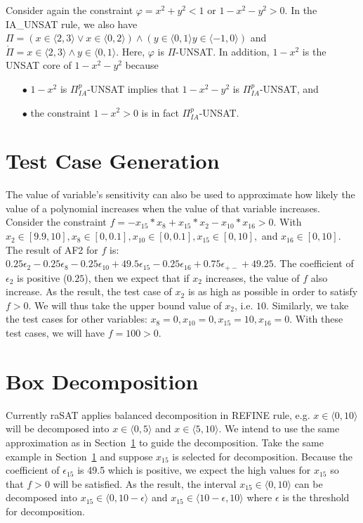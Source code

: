 \begin{example}
Consider again the constraint $\varphi = x^2 + y^2 < 1$ or $1 - x^2 - y^2 > 0$. In the \tiny IA\_UNSAT \normalsize rule, we also have $\Pi = (x \in \langle 2, 3 \rangle \vee x \in \langle 0, 2 \rangle) \wedge (y \in \langle 0, 1 \rangle y \in \langle -1, 0 \rangle)$ and $\mathring\Pi = x \in \langle 2, 3 \rangle \wedge y \in \langle 0, 1 \rangle$. Here, $\varphi$ is $\Pi$-UNSAT. In addition, $1 - x^2$ is the UNSAT core of $1 - x^2 - y^2$ because 
\begin{itemize}
\item[$\bullet$] $1 - x^2$ is $\Pi^p_{IA}$-UNSAT implies that $1 - x^2 - y^2$ is $\Pi^p_{IA}$-UNSAT, and 
\item[$\bullet$] the constraint $1 - x^2 > 0$ is in fact $\Pi^p_{IA}$-UNSAT.
\end{itemize} 
\end{example}


\section{Test Case Generation} \label{sec:testGen}
\sloppy
The value of variable's sensitivity can also be used to approximate how likely the value of a polynomial increases when the value of that variable increases. Consider the constraint $f = -x_{15}*x_8+x_{15}*x_2-x_{10}*x_{16}>0$. With ${x_2 \in [9.9, 10]}, {x_8 \in [0, 0.1]}, {x_{10} \in [0, 0.1]}, {x_{15} \in [0, 10]},$ and $ x_{16} \in [0, 10]$. The result of AF2 for $f$ is: $0.25 \epsilon_2 - 0.25 \epsilon_8 - 0.25 \epsilon_{10} + 49.5\epsilon_{15} - 0.25\epsilon_{16} + 0.75\epsilon_{+-} + 49.25$. The coefficient of $\epsilon_2$ is positive ($0.25$), then we expect that if $x_2$ increases, the value of $f$ also increase.  As the result, the test case of $x_2$ is as high as possible in order to satisfy $f>0$. We will thus take the upper bound value of $x_2$, i.e. $10$. Similarly, we take the test cases for other variables: $x_8=0, x_{10}=0, x_{15}=10, x_{16}=0$. With these test cases, we will have $f=100 > 0$.

\section{Box Decomposition}
Currently raSAT applies balanced decomposition in \tiny REFINE \normalsize rule, e.g. ${x \in \langle 0, 10 \rangle}$ will be decomposed into ${x \in \langle 0, 5 \rangle}$ and ${x \in \langle 5, 10 \rangle}$. We intend to use the same approximation as in Section~\ref{sec:testGen} to guide the decomposition. Take the same example in Section~\ref{sec:testGen} and suppose $x_{15}$ is selected for decomposition. Because the coefficient of $\epsilon_{15}$ is 49.5 which is positive, we expect the high values for $x_{15}$ so that $f > 0$ will be satisfied. As the result, the interval ${x_{15} \in \langle 0, 10 \rangle}$ can be decomposed into ${x_{15} \in \langle 0, 10 - \epsilon \rangle}$ and ${x_{15} \in \langle 10 - \epsilon, 10 \rangle}$ where $\epsilon$ is the threshold for decomposition.

